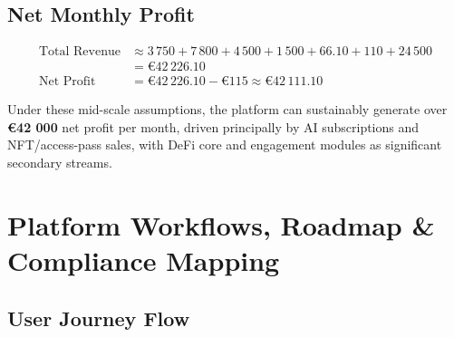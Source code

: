 \documentclass[13pt]{extarticle}
\begin{document}
\subsection{Net Monthly Profit}
\[
  \begin{aligned}
    \text{Total Revenue} &\approx 3\,750 + 7\,800 + 4\,500 + 1\,500 + 66.10 + 110 + 24\,500 \\
                         &= €42\,226.10 \\
    \text{Net Profit} &= €42\,226.10 - €115 \approx €42\,111.10
  \end{aligned}
\]

Under these mid-scale assumptions, the platform can sustainably generate over \textbf{€42 000} net profit per month, driven principally by AI subscriptions and NFT/access-pass sales, with DeFi core and engagement modules as significant secondary streams.  


\newpage
\section{Platform Workflows, Roadmap \& Compliance Mapping}

\subsection{User Journey Flow}
\end{document}
